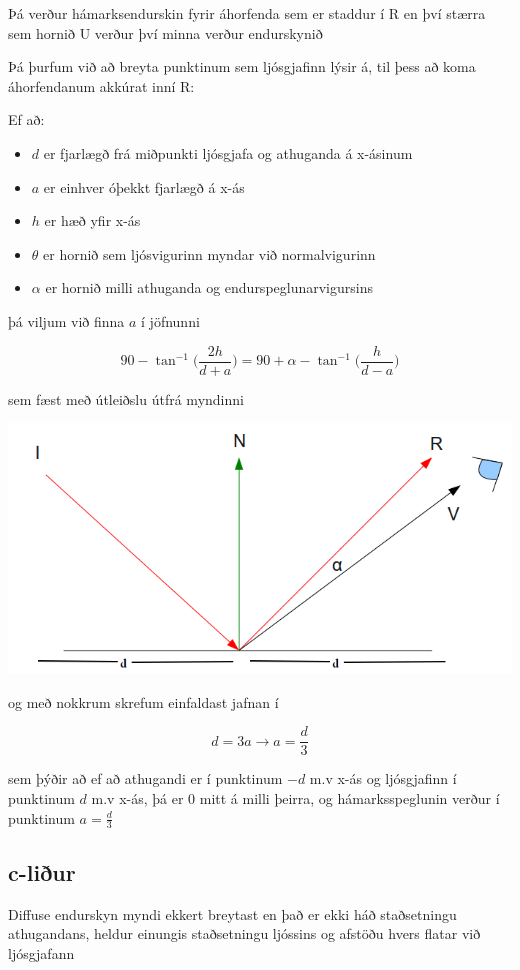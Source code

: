 \documentclass[11pt,twocolumn]{article}
\begin{document}
  Þá verður hámarksendurskin fyrir áhorfenda sem er staddur í R en því stærra sem hornið U verður því minna verður endurskynið

Þá þurfum við að breyta punktinum sem ljósgjafinn lýsir á, til þess að koma áhorfendanum akkúrat inní R:

Ef að:
\begin{itemize}
\item $d$ er fjarlægð frá miðpunkti ljósgjafa og athuganda á x-ásinum
\item $a$ er einhver óþekkt fjarlægð á x-ás
\item $h$ er hæð yfir x-ás
\item $\theta$ er hornið sem ljósvigurinn myndar við normalvigurinn
\item $\alpha$ er hornið milli athuganda og endurspeglunarvigursins
\end{itemize}

þá viljum við finna $a$ í jöfnunni

\[
90 - \tan^{-1}\bigg(\frac{2h}{d+a}\bigg) = 90 + \alpha - \tan^{-1}\bigg(\frac{h}{d-a}\bigg)
\]

sem fæst með útleiðslu útfrá myndinni

\includegraphics[width = \linewidth]{6.png}


og með nokkrum skrefum einfaldast jafnan í

\[
d = 3a \to a = \frac{d}{3}
\]

sem þýðir að ef að athugandi er í punktinum $-d$ m.v x-ás og ljósgjafinn í punktinum $d$ m.v x-ás, þá er 0 mitt á milli þeirra, og hámarksspeglunin verður í punktinum $a = \frac{d}{3}$

\subsection*{c-liður}

Diffuse endurskyn myndi ekkert breytast en það er ekki háð staðsetningu athugandans, heldur einungis staðsetningu ljóssins og afstöðu hvers flatar við ljósgjafann
\end{document}
